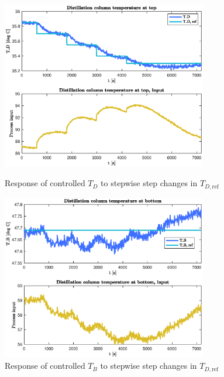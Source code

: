 \documentclass[12pt]{article}
\begin{document}
\begin{figure}[p]
\centering
\includegraphics[width=0.8\textwidth]{../Systemanalyse/Log_Data_to_Matlab/Figurer/LV_tuning/T_D_closed_loop_with_stepwise_T_D_step.eps}
\caption{Response of controlled $T_D$ to stepwise step changes in $T_{D, \textrm{ref}}$}
\label{fig:TD_TD_cl_stepwise}

\includegraphics[width=0.8\textwidth]{../Systemanalyse/Log_Data_to_Matlab/Figurer/LV_tuning/T_B_closed_loop_with_stepwise_T_D_step.eps}
\caption{Response of controlled $T_B$ to stepwise step changes in $T_{D, \textrm{ref}}$}
\label{fig:TB_TD_cl_stepwise}
\end{figure}
\end{document}
